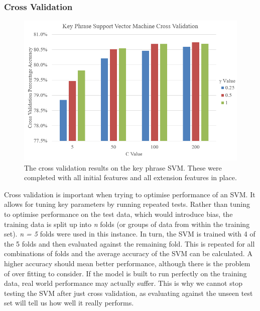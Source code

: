 \subsubsection*{Cross Validation}

\begin{figure}
	\includegraphics[width=\textwidth]{img/kpsvmcrossvalidation.png}
	\caption[Key Phrase SVM Cross Validation]{The cross validation results on the key phrase SVM. These were completed with all initial features and all extension features in place.}
	\label{figure:kpsvmcv}
\end{figure}

Cross validation is important when trying to optimise performance of an SVM. It allows for tuning key parameters by running repeated tests. Rather than tuning to optimise performance on the test data, which would introduce bias, the training data is split up into \textit{n} folds (or groups of data from within the training set). \textit{n = 5} folds were used in this instance. In turn, the SVM is trained with 4 of the 5 folds and then evaluated against the remaining fold. This is repeated for all combinations of folds and the average accuracy of the SVM can be calculated. A higher accuracy should mean better performance, although there is the problem of over fitting to consider. If the model is built to run perfectly on the training data, real world performance may actually suffer. This is why we cannot stop testing the SVM after just cross validation, as evaluating against the unseen test set will tell us how well it really performs. 

